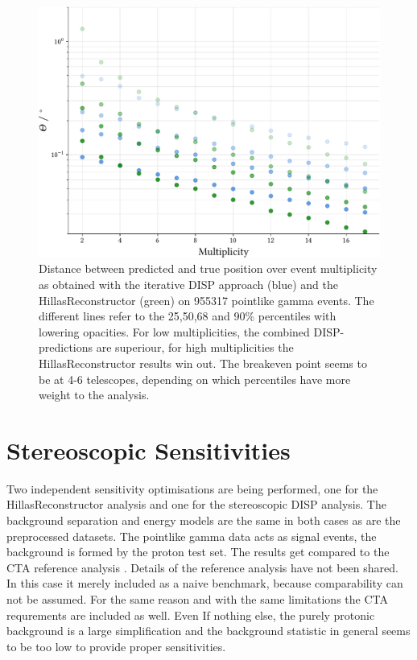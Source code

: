 \begin{figure}
    \centering
    \captionsetup{width=0.9\linewidth}
    \includegraphics[width=0.6\linewidth]{../analysis/plots/gamma/pairwise_median_100_vs_multi_comp.pdf}
    \caption{Distance between predicted and true position over event multiplicity as obtained with
    the iterative DISP approach (blue) and the HillasReconstructor (green)
    on 955317 pointlike gamma events.
    The different lines refer to the 25,50,68 and 90\% percentiles with 
    lowering opacities.
    For low multiplicities, the combined DISP-predictions are superiour, 
    for high multiplicities the HillasReconstructor results win out.
    The breakeven point seems to be at 4-6 telescopes, depending on 
    which percentiles have more weight to the analysis.}
    \label{fig:stereo_magic_multi}
\end{figure}

\section{Stereoscopic Sensitivities}

Two independent sensitivity optimisations are being performed,
one for the HillasReconstructor analysis and one for the stereoscopic DISP analysis.
The background separation and energy models are the same in both cases
as are the preprocessed datasets.
The pointlike gamma data acts as signal events, the background is formed by
the proton test set. The results get compared
to the CTA reference analysis \cite{cta_web}.
Details of the reference analysis have not been shared.
In this case it merely included as a naive benchmark, because
comparability can not be assumed.
For the same reason and with the same limitations
the CTA requrements are included as well.
Even If nothing else, the purely protonic background is a large simplification
and the background statistic in general seems to be too low to
provide proper sensitivities. 

